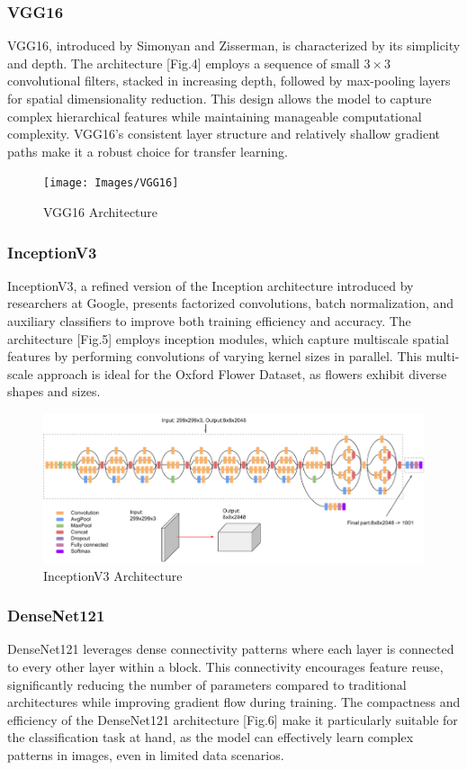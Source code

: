 \subsubsection*{VGG16}
VGG16, introduced by Simonyan and Zisserman, is characterized by its simplicity and depth. The architecture [Fig.4] employs a
sequence of small $3 \times 3$ convolutional filters, stacked in increasing depth, followed by max-pooling layers for
spatial dimensionality reduction. This design allows the model to capture complex hierarchical features while
maintaining manageable computational complexity. VGG16's consistent layer structure and relatively shallow gradient
paths make it a robust choice for transfer learning.

\begin{figure}[h!]
    \centering
    \texttt{[image: Images/VGG16]}
    \caption{VGG16 Architecture}
\end{figure}

\subsubsection*{InceptionV3}
InceptionV3, a refined version of the Inception architecture introduced by researchers at Google, presents factorized
convolutions, batch normalization, and auxiliary classifiers to improve both training efficiency and accuracy.
The architecture [Fig.5] employs inception modules, which capture multiscale spatial features by performing convolutions of
varying kernel sizes in parallel. This multi-scale approach is ideal for the Oxford Flower Dataset, as flowers exhibit
diverse shapes and sizes.

\begin{figure}[h!]
    \centering
    \includegraphics[width=.75\linewidth]{Images/InceptionV3}
    \caption{InceptionV3 Architecture}
\end{figure}

\subsubsection*{DenseNet121}
DenseNet121 leverages dense connectivity patterns where each layer is connected to every other layer within a block.
This connectivity encourages feature reuse, significantly reducing the number of parameters compared to traditional
architectures while improving gradient flow during training. The compactness and efficiency of the DenseNet121
architecture [Fig.6] make it particularly suitable for the classification task at hand, as the model can effectively learn
complex patterns in images, even in limited data scenarios.

